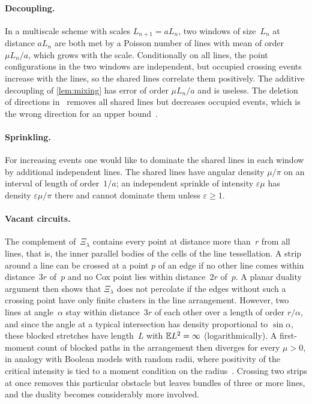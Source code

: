\documentclass[11pt,letterpaper]{article}
\begin{document}
\paragraph{Decoupling.} In a multiscale scheme with scales $L_{n+1}=aL_n$, two windows of size~$L_n$ at distance $aL_n$ are both met by a Poisson number of lines with mean of order $\mu L_n/a$, which grows with the scale. Conditionally on all lines, the point configurations in the two windows are independent, but occupied crossing events increase with the lines, so the shared lines correlate them positively. The additive decoupling of \cref{lem:mixing} has error of order $\mu L_n/a$ and is useless. The deletion of directions in~\cite{HJ26} removes all shared lines but decreases occupied events, which is the wrong direction for an upper bound~\cite[Remark~6.1]{HJ26}.

\paragraph{Sprinkling.} For increasing events one would like to dominate the shared lines in each window by additional independent lines. The shared lines have angular density $\mu/\pi$ on an interval of length of order~$1/a$; an independent sprinkle of intensity $\varepsilon\mu$ has density $\varepsilon\mu/\pi$ there and cannot dominate them unless $\varepsilon\ge1$.

\paragraph{Vacant circuits.} The complement of~$\Xi_\lambda$ contains every point at distance more than~$r$ from all lines, that is, the inner parallel bodies of the cells of the line tessellation. A strip around a line can be crossed at a point $p$ of an edge if no other line comes within distance~$3r$ of~$p$ and no Cox point lies within distance~$2r$ of~$p$. A planar duality argument then shows that $\Xi_\lambda$ does not percolate if the edges without such a crossing point have only finite clusters in the line arrangement. However, two lines at angle~$\alpha$ stay within distance~$3r$ of each other over a length of order $r/\alpha$, and since the angle at a typical intersection has density proportional to $\sin\alpha$, these blocked stretches have length~$L$ with $\mathbb E L^2=\infty$ (logarithmically). A first-moment count of blocked paths in the arrangement then diverges for every $\mu>0$, in analogy with Boolean models with random radii, where positivity of the critical intensity is tied to a moment condition on the radius~\cite{Gou08}. Crossing two strips at once removes this particular obstacle but leaves bundles of three or more lines, and the duality becomes considerably more involved.
\end{document}
